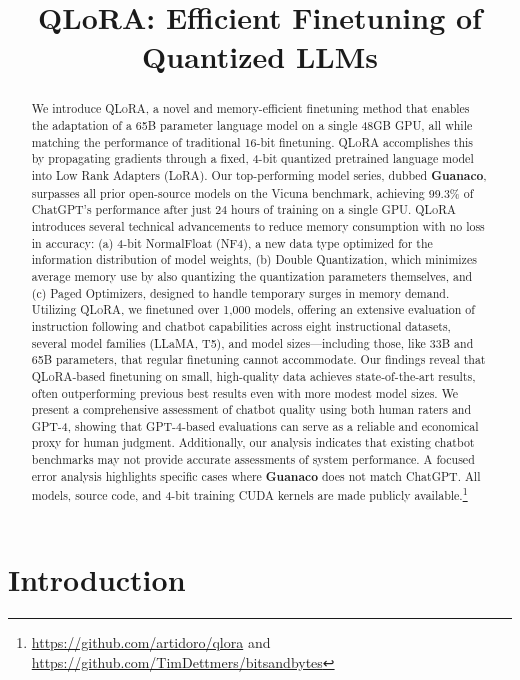 \title{QLoRA: Efficient Finetuning of Quantized LLMs}

\begin{abstract}
We introduce \textsc{QLoRA}, a novel and memory-efficient finetuning method that enables the adaptation of a 65B parameter language model on a single 48GB GPU, all while matching the performance of traditional 16-bit finetuning. \textsc{QLoRA} accomplishes this by propagating gradients through a fixed, 4-bit quantized pretrained language model into Low Rank Adapters (LoRA). Our top-performing model series, dubbed \textbf{Guanaco}, surpasses all prior open-source models on the Vicuna benchmark, achieving 99.3\% of ChatGPT's performance after just 24 hours of training on a single GPU. \textsc{QLoRA} introduces several technical advancements to reduce memory consumption with no loss in accuracy: (a) 4-bit NormalFloat (NF4), a new data type optimized for the information distribution of model weights, (b) Double Quantization, which minimizes average memory use by also quantizing the quantization parameters themselves, and (c) Paged Optimizers, designed to handle temporary surges in memory demand. Utilizing \textsc{QLoRA}, we finetuned over 1,000 models, offering an extensive evaluation of instruction following and chatbot capabilities across eight instructional datasets, several model families (LLaMA, T5), and model sizes—including those, like 33B and 65B parameters, that regular finetuning cannot accommodate. Our findings reveal that \textsc{QLoRA}-based finetuning on small, high-quality data achieves state-of-the-art results, often outperforming previous best results even with more modest model sizes. We present a comprehensive assessment of chatbot quality using both human raters and GPT-4, showing that GPT-4-based evaluations can serve as a reliable and economical proxy for human judgment. Additionally, our analysis indicates that existing chatbot benchmarks may not provide accurate assessments of system performance. A focused error analysis highlights specific cases where \textbf{Guanaco} does not match ChatGPT. All models, source code, and 4-bit training CUDA kernels are made publicly available.\footnote{\url{https://github.com/artidoro/qlora} and \url{https://github.com/TimDettmers/bitsandbytes}}
\end{abstract}

\section{Introduction}

